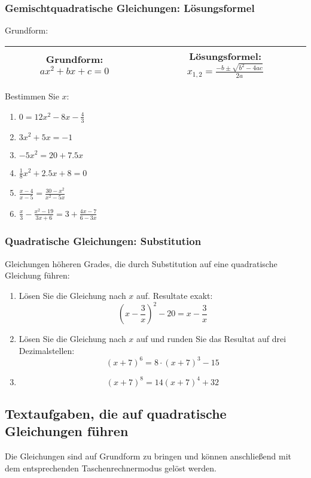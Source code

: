   \subsubsection{Gemischtquadratische Gleichungen: Lösungsformel}
  Grundform:

  \begin{tabular}{|c|c|}%
    \hline%
Grundform: $ax^2 + bx +c = 0$ & Lösungsformel: $x_{1,2} = \frac{-b \pm \sqrt{b^2 - 4ac}}{2a}$\\%
    \hline%
    \end{tabular}%

  Bestimmen Sie $x$:
  \begin{multicols}{3}
  \begin{enumerate}
  \item $0 = 12x^2 - 8x - \frac{4}{3}$
  \item $3x^2 + 5x = -1$
  \item $-5x^2 = 20 + 7.5x$
  \item $\frac{1}{8}x^2 + 2.5x + 8 = 0$
  \item $\frac{x-4}{x-5} = \frac{30-x^2}{x^2-5x}$
    \item $\frac{x}{3} - \frac{x^2-19}{3x+6} = 3 + \frac{4x-7}{6-3x}$
    \end{enumerate}
    \end{multicols}

  \subsubsection{Quadratische Gleichungen: Substitution}
  Gleichungen höheren Grades, die durch Substitution auf eine
  quadratische Gleichung führen:

  \begin{enumerate}
  \item Lösen Sie die Gleichung nach $x$ auf. Resultate exakt:
    $$\left(x-\frac{3}{x}\right)^2 - 20 = x - \frac{3}{x}$$

  \item Lösen Sie die Gleichung nach $x$ auf und runden Sie das
    Resultat auf drei Dezimalstellen:
    $$(x+7)^6 = 8\cdot (x+7)^3 - 15$$

  \item $$(x+7)^8 = 14(x+7)^4 + 32$$
  \end{enumerate}


    \subsection{Textaufgaben, die auf quadratische Gleichungen führen}
Die Gleichungen sind auf Grundform zu bringen und können anschließend
mit dem entsprechenden Taschenrechnermodus gelöst werden.


